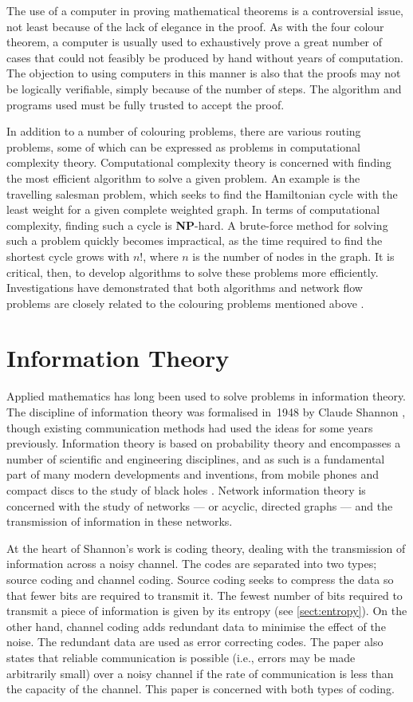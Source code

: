 The use of a computer in proving mathematical theorems is a controversial issue, not least because of the lack of elegance in the proof. As with the four colour theorem, a computer is usually used to exhaustively prove a great number of cases that could not feasibly be produced by hand without years of computation. The objection to using computers in this manner is also that the proofs may not be logically verifiable, simply because of the number of steps. The algorithm and programs used must be fully trusted to accept the proof.

In addition to a number of colouring problems, there are various routing problems, some of which can be expressed as problems in computational complexity theory. Computational complexity theory is concerned with finding the most efficient algorithm to solve a given problem. An example is the travelling salesman problem, which seeks to find the Hamiltonian cycle with the least weight for a given complete weighted graph. In terms of computational complexity, finding such a cycle is \textbf{NP}-hard. A brute-force method for solving such a problem quickly becomes impractical, as the time required to find the shortest cycle grows with $n!$, where $n$ is the number of nodes in the graph. It is critical, then, to develop algorithms to solve these problems more efficiently. Investigations have demonstrated that both algorithms and network flow problems are closely related to the colouring problems mentioned above \cite{wils2003}.

\section{Information Theory}

Applied mathematics has long been used to solve problems in information theory. The discipline of information theory was formalised in~1948 by Claude Shannon \cite{shan1948}, though existing communication methods had used the ideas for some years previously. Information theory is based on probability theory and encompasses a number of scientific and engineering disciplines, and as such is a fundamental part of many modern developments and inventions, from mobile phones and compact discs to the study of black holes \cite{beke1973}. Network information theory is concerned with the study of networks --- or acyclic, directed graphs --- and the transmission of information in these networks.

At the heart of Shannon's work is coding theory, dealing with the transmission of information across a noisy channel. The codes are separated into two types; source coding and channel coding. Source coding seeks to compress the data so that fewer bits are required to transmit it. The fewest number of bits required to transmit a piece of information is given by its entropy (see \autoref{sect:entropy}). On the other hand, channel coding adds redundant data to minimise the effect of the noise. The redundant data are used as error correcting codes. The paper also states that reliable communication is possible (i.e., errors may be made arbitrarily small) over a noisy channel if the rate of communication is less than the capacity of the channel. This paper is concerned with both types of coding.

